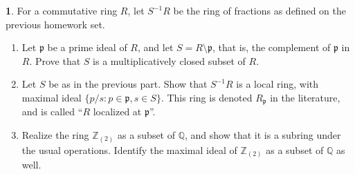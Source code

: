 \documentclass[12pt]{article}
\newcommand{\p}{\mathfrak{p}}
\theoremstyle{definition}
\newtheorem{ex}{}
\begin{document}
\begin{ex}
	For a commutative ring $R$, let $S^{-1}R$ be the ring of fractions as defined on the previous homework set.
	\begin{enumerate}[label=(\alph*)]
		\item Let $\p$ be a prime ideal of $R$, and let $S = R \setminus \p$, that is, the complement of $\p$ in $R$.
		      Prove that $S$ is a multiplicatively closed subset of $R$.
		\item Let $S$ be as in the previous part.
		      Show that $S^{-1}R$ is a local ring, with maximal ideal $\lbrace p/s : p \in \p, s \in S \rbrace$.
		      This ring is denoted $R_\p$ in the literature, and is called ``$R$ localized at $\p$''.
		\item Realize the ring $\mathbb{Z}_{(2)}$ as a subset of $\mathbb{Q}$, and show that it is a subring under the usual operations.
		      Identify the maximal ideal of $\mathbb{Z}_{(2)}$ as a subset of $\mathbb{Q}$ as well.
	\end{enumerate}
\end{ex}
\end{document}
